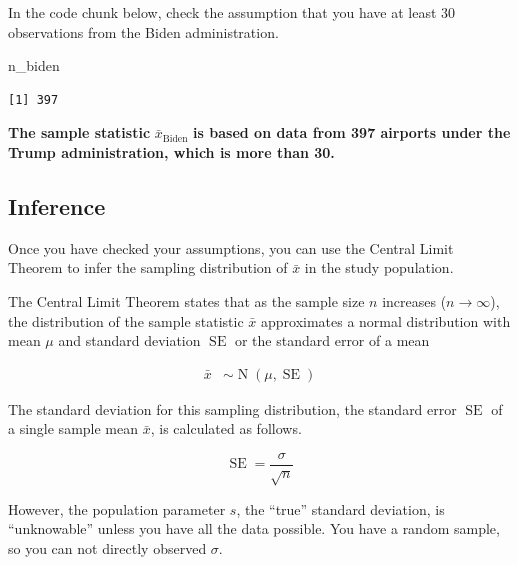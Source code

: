 \documentclass[
  letterpaper,
  DIV=11,
  numbers=noendperiod]{scrartcl}
\newenvironment{Shaded}{\begin{snugshade}}{\end{snugshade}}
\newcommand{\NormalTok}[1]{\textcolor[rgb]{0.00,0.23,0.31}{#1}}
\begin{document}
In the code chunk below, check the assumption that you have at least 30
observations from the Biden administration.

\begin{Shaded}
\begin{Highlighting}[]
\NormalTok{n\_biden}
\end{Highlighting}
\end{Shaded}

\begin{verbatim}
[1] 397
\end{verbatim}

\begin{tcolorbox}[enhanced jigsaw, toprule=.15mm, breakable, leftrule=.75mm, bottomrule=.15mm, rightrule=.15mm, colback=white, opacityback=0, colframe=quarto-callout-warning-color-frame, left=2mm, arc=.35mm]

\textbf{The sample statistic} \(\bar{x}_{\text{Biden}}\) \textbf{is
based on data from 397 airports under the Trump administration, which is
more than 30.}

\end{tcolorbox}

\subsection{Inference}\label{inference-1}

Once you have checked your assumptions, you can use the Central Limit
Theorem to infer the sampling distribution of \(\bar{x}\) in the study
population.

The Central Limit Theorem states that as the sample size \(n\) increases
(\(n \to \infty\)), the distribution of the sample statistic \(\bar{x}\)
approximates a normal distribution with mean \(\mu\) and standard
deviation \(\operatorname{SE}\) or the standard error of a mean

\[
\begin{aligned}
\bar{x} &\sim \operatorname{N}\left(\mu, \operatorname{SE}\right)
\end{aligned}
\]

The standard deviation for this sampling distribution, the standard
error \(\operatorname{SE}\) of a single sample mean \(\bar{x}\), is
calculated as follows.

\[
\operatorname{SE}=\frac{\sigma}{\sqrt{n}}
\]

However, the population parameter \(s\), the ``true'' standard
deviation, is ``unknowable'' unless you have all the data possible. You
have a random sample, so you can not directly observed \(\sigma\).
\end{document}
